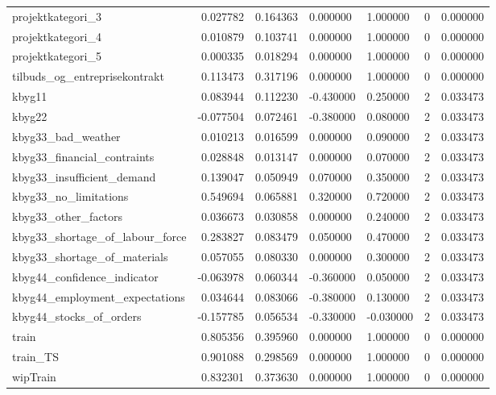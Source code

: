 \begin{landscape}
\begin{longtable}[h!]{lrrllrr}
projektkategori_3 & 0.027782 & 0.164363 & 0.000000 & 1.000000 & 0 & 0.000000 \\
projektkategori_4 & 0.010879 & 0.103741 & 0.000000 & 1.000000 & 0 & 0.000000 \\
projektkategori_5 & 0.000335 & 0.018294 & 0.000000 & 1.000000 & 0 & 0.000000 \\
tilbuds_og_entreprisekontrakt & 0.113473 & 0.317196 & 0.000000 & 1.000000 & 0 & 0.000000 \\
kbyg11 & 0.083944 & 0.112230 & -0.430000 & 0.250000 & 2 & 0.033473 \\
kbyg22 & -0.077504 & 0.072461 & -0.380000 & 0.080000 & 2 & 0.033473 \\
kbyg33_bad_weather & 0.010213 & 0.016599 & 0.000000 & 0.090000 & 2 & 0.033473 \\
kbyg33_financial_contraints & 0.028848 & 0.013147 & 0.000000 & 0.070000 & 2 & 0.033473 \\
kbyg33_insufficient_demand & 0.139047 & 0.050949 & 0.070000 & 0.350000 & 2 & 0.033473 \\
kbyg33_no_limitations & 0.549694 & 0.065881 & 0.320000 & 0.720000 & 2 & 0.033473 \\
kbyg33_other_factors & 0.036673 & 0.030858 & 0.000000 & 0.240000 & 2 & 0.033473 \\
kbyg33_shortage_of_labour_force & 0.283827 & 0.083479 & 0.050000 & 0.470000 & 2 & 0.033473 \\
kbyg33_shortage_of_materials & 0.057055 & 0.080330 & 0.000000 & 0.300000 & 2 & 0.033473 \\
kbyg44_confidence_indicator & -0.063978 & 0.060344 & -0.360000 & 0.050000 & 2 & 0.033473 \\
kbyg44_employment_expectations & 0.034644 & 0.083066 & -0.380000 & 0.130000 & 2 & 0.033473 \\
kbyg44_stocks_of_orders & -0.157785 & 0.056534 & -0.330000 & -0.030000 & 2 & 0.033473 \\
train & 0.805356 & 0.395960 & 0.000000 & 1.000000 & 0 & 0.000000 \\
train_TS & 0.901088 & 0.298569 & 0.000000 & 1.000000 & 0 & 0.000000 \\
wipTrain & 0.832301 & 0.373630 & 0.000000 & 1.000000 & 0 & 0.000000 \\
\end{longtable}\end{landscape}
